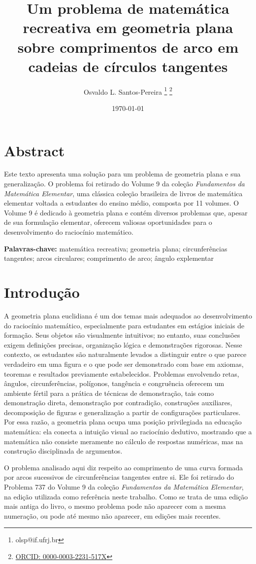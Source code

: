 \documentclass[a4paper,12pt,oneside]{article}
\title{Um problema de matemática recreativa em geometria plana sobre comprimentos de arco em cadeias de círculos tangentes}
\author[1]{Osvaldo L. Santos-Pereira 
\thanks{olsp@if.ufrj.br}
\thanks{\href{https://orcid.org/0000-0003-2231-517X}{ORCID: 0000-0003-2231-517X}}}
\affil[1]{Programa de Pós-Graduação Multidisciplinar em Física Aplicada, Instituto de Física, Universidade Federal do Rio de Janeiro}
\date{\today}
\makeatletter
\renewenvironment{abstract}{
    \if@twocolumn
        \section*{Abstract}
    \else
        \small
        \begin{center}
            {\bfseries \abstractname\vspace{-.5em}\vspace{\z@}}%
        \end{center}
        \noindent
    \fi
}
\numberwithin{equation}{section}
\def\ni{\noindent}
\numberwithin{equation}{section}
\makeatother
\begin{document}
\maketitle

\begin{abstract}
\ni
Este texto apresenta uma solução para um problema de geometria plana e sua generalização. O problema foi retirado do Volume 9 da coleção \textit{Fundamentos da Matemática Elementar}, uma clássica coleção brasileira de livros de matemática elementar voltada a estudantes do ensino médio, composta por 11 volumes. O Volume 9 é dedicado à geometria plana e contém diversos problemas que, apesar de sua formulação elementar, oferecem valiosas oportunidades para o desenvolvimento do raciocínio matemático.
\end{abstract}

\noindent\textbf{Palavras-chave:} matemática recreativa; geometria plana; circunferências tangentes; arcos circulares; comprimento de arco; ângulo explementar


\section{Introdução}

A geometria plana euclidiana é um dos temas mais adequados ao desenvolvimento do raciocínio matemático, especialmente para estudantes em estágios iniciais de formação. Seus objetos são visualmente intuitivos; no entanto, suas conclusões exigem definições precisas, organização lógica e demonstrações rigorosas. Nesse contexto, os estudantes são naturalmente levados a distinguir entre o que parece verdadeiro em uma figura e o que pode ser demonstrado com base em axiomas, teoremas e resultados previamente estabelecidos. Problemas envolvendo retas, ângulos, circunferências, polígonos, tangência e congruência oferecem um ambiente fértil para a prática de técnicas de demonstração, tais como demonstração direta, demonstração por contradição, construções auxiliares, decomposição de figuras e generalização a partir de configurações particulares. Por essa razão, a geometria plana ocupa uma posição privilegiada na educação matemática: ela conecta a intuição visual ao raciocínio dedutivo, mostrando que a matemática não consiste meramente no cálculo de respostas numéricas, mas na construção disciplinada de argumentos.

O problema analisado aqui diz respeito ao comprimento de uma curva formada por arcos sucessivos de circunferências tangentes entre si. Ele foi retirado do Problema 737 do Volume 9 da coleção \textit{Fundamentos da Matemática Elementar}, na edição utilizada como referência neste trabalho. Como se trata de uma edição mais antiga do livro, o mesmo problema pode não aparecer com a mesma numeração, ou pode até mesmo não aparecer, em edições mais recentes.
\end{document}
